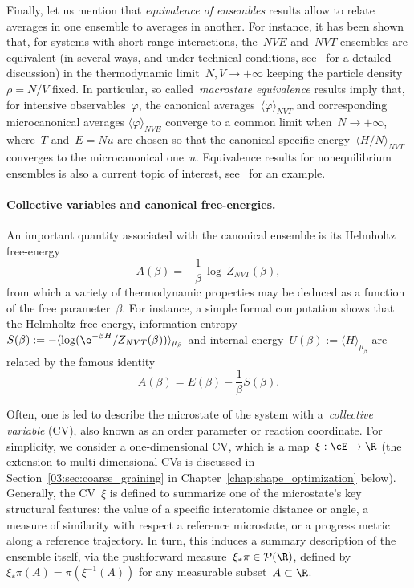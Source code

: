 Finally, let us mention that \textit{equivalence of ensembles} results allow to relate averages in one ensemble to averages in another. For instance, it has been shown that, for systems with short-range interactions, the~$NVE$ and~$NVT$ ensembles are equivalent (in several ways, and under technical conditions, see~\cite{T15} for a detailed discussion) in the thermodynamic limit~$N,V\to +\infty$ keeping the particle density~$\rho = N/V$ fixed.
In particular, so called~\textit{macrostate equivalence} results imply that, for intensive observables~$\varphi$, the canonical averages~$\langle\varphi\rangle_{NVT}$  and corresponding microcanonical averages $\langle \varphi\rangle_{NVE}$ converge to a common limit when~$N\to +\infty$, where~$T$ and~${E=Nu}$ are chosen so that the canonical specific energy~$\langle H/N\rangle_{NVT}$ converges to the microcanonical one~$u$.
Equivalence results for nonequilibrium ensembles is also a current topic of interest, see~\cite{CT13} for an example.

\paragraph{Collective variables and canonical free-energies.}
An important quantity associated with the canonical ensemble is its Helmholtz free-energy
\begin{equation}
    \label{eq:01:helmholtz}
    A(\beta)=-\frac{1}{\beta}\,\log\,Z_{NVT}(\beta),
\end{equation}
from which a variety of thermodynamic properties may be deduced as a function of the free parameter~$\beta$. For instance, a simple formal computation shows that the Helmholtz free-energy, information entropy~$S(\beta) := -\langle \log(\e^{-\beta H}/Z_{NVT}(\beta))\rangle_{\mu_\beta}$ and internal energy~$U(\beta):=\langle H\rangle_{\mu_\beta}$ are related by the famous identity
\begin{equation}
    A(\beta) = E(\beta) - \frac1\beta S(\beta).
\end{equation}

Often, one is led to describe the microstate of the system with a~\textit{collective variable} (CV), also known as an order parameter or reaction coordinate. For simplicity, we consider a one-dimensional CV, which is a map~$\xi:\cE\to\R$ (the extension to multi-dimensional CVs is discussed in Section~\ref{03:sec:coarse_graining} in Chapter~\ref{chap:shape_optimization} below).
Generally, the CV~$\xi$ is defined to summarize one of the microstate's key structural features: the value of a specific interatomic distance or angle, a measure of similarity with respect a reference microstate, or a progress metric along a reference trajectory.
In turn, this induces a summary description of the ensemble itself, via the pushforward measure~$\xi_*\pi \in \mathcal P(\R)$, defined by~$\xi_*\pi(A) = \pi(\xi^{-1}(A))$ for any measurable subset~$A\subset\R$.

